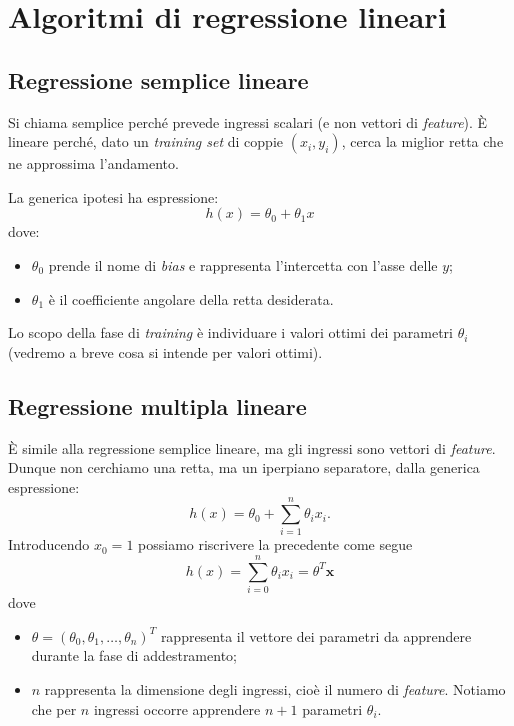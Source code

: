 \section{Algoritmi di regressione lineari}

\subsection{Regressione semplice lineare}
Si chiama semplice perché prevede ingressi scalari (e non vettori di \emph{feature}). È lineare perché, dato un \emph{training set} di coppie $(x_i, y_i)$, cerca la miglior retta che ne approssima l'andamento.

La generica ipotesi ha espressione:
\begin{equation*}
 h(x) = \theta_0 + \theta_1 x
\end{equation*}
dove:
\begin{itemize}
  \item $\theta_0$ prende il nome di \emph{bias} e rappresenta l'intercetta con l'asse delle $y$;
  \item $\theta_1$ è il coefficiente angolare della retta desiderata.
\end{itemize}
Lo scopo della fase di \emph{training} è individuare i valori ottimi dei parametri $\theta_i$ (vedremo a breve cosa si intende per valori ottimi).

\subsection{Regressione multipla lineare}
È simile alla regressione semplice lineare, ma gli ingressi sono vettori di \emph{feature}.  Dunque non cerchiamo una retta, ma un iperpiano separatore, dalla generica espressione:
\begin{equation*}
  h(x) = \theta_0 + \sum_{i=1}^n \theta_i x_i.
\end{equation*}
Introducendo $x_0=1$ possiamo riscrivere la precedente come segue
\begin{equation*}
  h(x) = \sum_{i=0}^n \theta_i x_i = \theta^T \mathbf{x}
\end{equation*}
dove 
\begin{itemize}
  \item $\theta = {(\theta_0, \theta_1, \dots, \theta_n)}^T$ rappresenta il vettore dei parametri da apprendere durante la fase di addestramento;
  \item $n$ rappresenta la dimensione degli ingressi, cioè il numero di \emph{feature}. Notiamo che per $n$ ingressi occorre apprendere $n+1$ parametri $\theta_i$.
\end{itemize}

